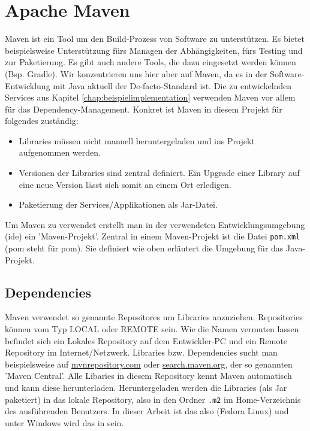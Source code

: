 \section{Apache Maven}
\label{chap:maven}
Maven ist ein Tool um den Build-Prozess von Software zu unterstützen. Es bietet beispielsweise Unterstützung fürs Managen der Abhängigkeiten, fürs Testing und zur Paketierung. Es gibt auch andere Tools, die dazu eingesetzt werden können (Bsp. Gradle). Wir konzentrieren uns hier aber auf Maven, da es in der Software-Entwicklung mit Java aktuell der De-facto-Standard ist. Die zu entwickelnden Services aus Kapitel \ref{chap:beispielimplementation} verwenden Maven vor allem für das Dependency-Management. Konkret ist Maven in diesem Projekt für folgendes zuständig:
\begin{itemize}
	\item
	Libraries müssen nicht manuell heruntergeladen und ins Projekt aufgenommen werden.
	\item
	Versionen der Libraries sind zentral definiert. Ein Upgrade einer Library auf eine neue Version lässt sich somit an einem Ort erledigen.
	\item
	Paketierung der Services/Applikationen als Jar-Datei.
\end{itemize}
Um Maven zu verwendet erstellt man in der verwendeten Entwicklungsumgebung (\acrshort{ide}) ein 'Maven-Projekt'. Zentral in einem Maven-Projekt ist die Datei \texttt{pom.xml} (\acrshort{pom} steht für \acrlong{pom}). Sie definiert wie oben erläutert die Umgebung für das Java-Projekt.

\subsection{Dependencies}
Maven verwendet so genannte Repositores um Libraries anzuziehen. Repositories können vom Typ LOCAL oder REMOTE sein. Wie die Namen vermuten lassen befindet sich ein Lokales Repository auf dem Entwickler-PC und ein Remote Repository im Internet/Netzwerk. Libraries bzw. Dependencies sucht man beispielsweise auf \href{https://mvnrepository.com/}{mvnrepository.com} oder \href{https://search.maven.org}{search.maven.org}, der so genannten 'Maven Central'. Alle Libaries in diesem Repository kennt Maven automatisch und kann diese herunterladen. Heruntergeladen werden die Libraries (als Jar paketiert) in das lokale Repository, also in den Ordner \texttt{.m2} im Home-Verzeichnis des ausführenden Benutzers. In dieser Arbeit ist das also  (Fedora Linux) und unter Windows wird das in  sein.

